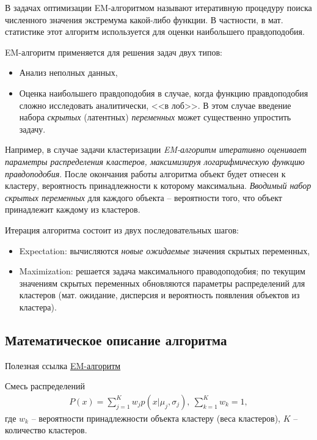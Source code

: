 \documentclass[%
	11pt,
	a4paper,
	utf8,
		]{article}
\begin{document}
В задачах оптимизации EM-алгоритмом называют итеративную процедуру поиска численного значения экстремума какой-либо функции. В частности, в мат. статистике этот алгоритм используется для оценки наибольшего правдоподобия.

EM-алгоритм применяется для решения задач двух типов:
\begin{itemize}
	\item Анализ неполных данных,
	
	\item Оценка наибольшего правдоподобия в случае, когда функцию правдоподобия сложно исследовать аналитически, <<в лоб>>. В этом случае введение набора \emph{скрытых} (латентных) \emph{переменных} может существенно упростить задачу.
\end{itemize}

Например, в случае задачи кластеризации \emph{EM-алгоритм итеративно оценивает параметры распределения кластеров, максимизируя логарифмическую функцию правдоподобия}. После окончания работы алгоритма объект будет отнесен к кластеру, вероятность принадлежности к которому максимальна. \emph{Вводимый набор скрытых переменных} для каждого объекта -- вероятности того, что объект принадлежит каждому из кластеров.

Итерация алгоритма состоит из двух последовательных шагов:
\begin{itemize}
	\item Expectation: вычисляются \emph{новые ожидаемые} значения скрытых переменных,
	
	\item Maximization: решается задача максимального праводоподобия; по текущим значениям скрытых переменных обновляются параметры распределений для кластеров (мат. ожидание, дисперсия и вероятность появления объектов из кластера).
\end{itemize}

\subsection{Математическое описание алгоритма}

Полезная ссылка \href{https://algowiki-project.org/ru/%D0%A3%D1%87%D0%B0%D1%81%D1%82%D0%BD%D0%B8%D0%BA:Noite/EM-%D0%B0%D0%BB%D0%B3%D0%BE%D1%80%D0%B8%D1%82%D0%BC_%D0%BA%D0%BB%D0%B0%D1%81%D1%82%D0%B5%D1%80%D0%B8%D0%B7%D0%B0%D1%86%D0%B8%D0%B8}{EM-алгоритм}

Смесь распределений
\begin{align*}
	P(x) = \sum_{j=1}^{K} w_j p(x | \mu_j, \sigma_j), \ \sum_{k=1}^K w_k = 1,
\end{align*}
где $ w_k $ -- вероятности принадлежности объекта кластеру (веса кластеров), $ K $ -- количество кластеров.
\end{document}
